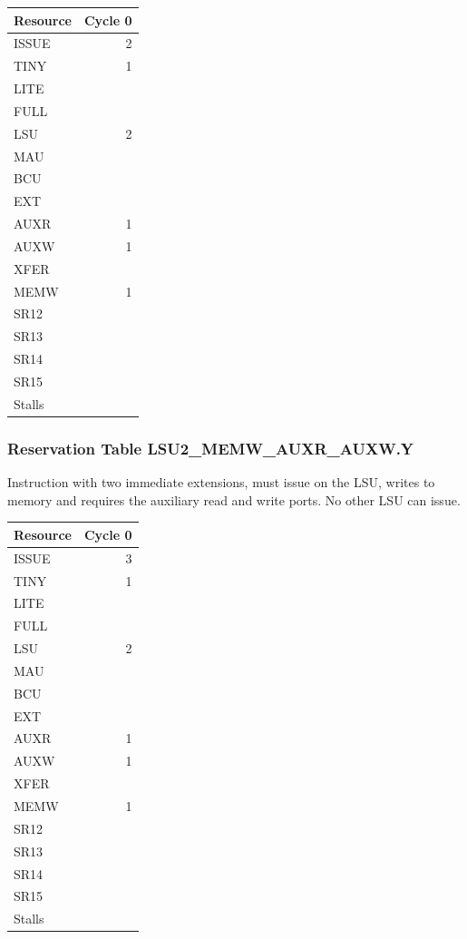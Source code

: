 \begin{tabular}{|l|r|} \hline
Resource	& Cycle 0 \\ \hline
\textsf{ISSUE}	& 2	\\
\textsf{TINY}	& 1	\\
\textsf{LITE}	& 	\\
\textsf{FULL}	& 	\\
\textsf{LSU}	& 2	\\
\textsf{MAU}	& 	\\
\textsf{BCU}	& 	\\
\textsf{EXT}	& 	\\
\textsf{AUXR}	& 1	\\
\textsf{AUXW}	& 1	\\
\textsf{XFER}	& 	\\
\textsf{MEMW}	& 1	\\
\textsf{SR12}	& 	\\
\textsf{SR13}	& 	\\
\textsf{SR14}	& 	\\
\textsf{SR15}	& 	\\
\hline Stalls	& 	\\
\hline \end{tabular}

\subsubsection{Reservation Table LSU2\_MEMW\_AUXR\_AUXW.Y} \label{sec:reservation-LSU2-MEMW-AUXR-AUXW.Y}

Instruction with two immediate extensions, must issue on the LSU, writes to memory and requires the auxiliary read and write ports. No other LSU can issue.
\medskip

\begin{tabular}{|l|r|} \hline
Resource	& Cycle 0 \\ \hline
\textsf{ISSUE}	& 3	\\
\textsf{TINY}	& 1	\\
\textsf{LITE}	& 	\\
\textsf{FULL}	& 	\\
\textsf{LSU}	& 2	\\
\textsf{MAU}	& 	\\
\textsf{BCU}	& 	\\
\textsf{EXT}	& 	\\
\textsf{AUXR}	& 1	\\
\textsf{AUXW}	& 1	\\
\textsf{XFER}	& 	\\
\textsf{MEMW}	& 1	\\
\textsf{SR12}	& 	\\
\textsf{SR13}	& 	\\
\textsf{SR14}	& 	\\
\textsf{SR15}	& 	\\
\hline Stalls	& 	\\
\hline \end{tabular}

